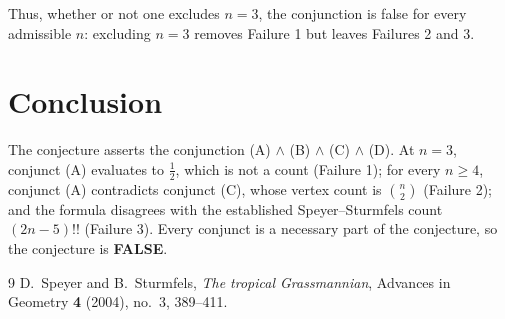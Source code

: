 \documentclass[11pt]{article}
\theoremstyle{definition}
\theoremstyle{remark}
\begin{document}
Thus, whether or not one excludes $n = 3$, the conjunction is false for every
admissible $n$: excluding $n = 3$ removes Failure 1 but leaves Failures 2 and 3.

\section{Conclusion}

The conjecture asserts the conjunction (A) $\wedge$ (B) $\wedge$ (C) $\wedge$ (D).
At $n = 3$, conjunct (A) evaluates to $\tfrac12$, which is not a count (Failure 1);
for every $n \ge 4$, conjunct (A) contradicts conjunct (C), whose vertex count is
$\binom{n}{2}$ (Failure 2); and the formula disagrees with the established
Speyer--Sturmfels count $(2n-5)!!$ (Failure 3). Every conjunct is a necessary part
of the conjecture, so the conjecture is \textbf{FALSE}.

\begin{thebibliography}{9}
D.~Speyer and B.~Sturmfels,
\emph{The tropical Grassmannian},
Advances in Geometry \textbf{4} (2004), no.~3, 389--411.
\end{thebibliography}
\end{document}
